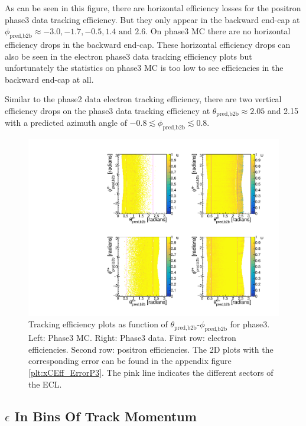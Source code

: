 \documentclass[a4paper,11pt,twosided,final,german,openbib,pdftex,listof=totoc,bibliography=totoc]{scrbook}
\begin{document}
As can be seen in this figure, there are horizontal efficiency losses for the positron phase3 data tracking efficiency. But they only appear in the backward end-cap at $\phi_{\textrm{pred,b2b}} \approx -3.0, -1.7, -0.5, 1.4 \textrm{ and } 2.6$. On phase3 MC there are no horizontal efficiency drops in the backward end-cap. These horizontal efficiency drops can also be seen in the electron phase3 data tracking efficiency plots but unfortunately the statistics on phase3 MC is too low to see efficiencies in the backward end-cap at all.

Similar to the phase2 data electron tracking efficiency, there are two vertical efficiency drops on the phase3 data tracking efficiency at $\theta_{\textrm{pred,b2b}} \approx 2.05$ and 2.15 with a predicted azimuth angle of $-0.8 \lesssim \phi_{\textrm{pred,b2b}} \lesssim 0.8$.


\begin{figure}[!htbp]
	\centering
	\includegraphics[width=\textwidth]{Plots/master3/xCEffTP_MCDataP3.pdf}
	\caption[$\theta_{\textrm{pred,b2b}}$-$\phi_{\textrm{pred,b2b}}$ Efficiency Plots Phase3]{Tracking efficiency plots as function of $\theta_{\textrm{pred,b2b}}$-$\phi_{\textrm{pred,b2b}}$ for phase3. Left: Phase3 MC. Right: Phase3 data. First row: electron efficiencies. Second row: positron efficiencies. The 2D plots with the corresponding error can be found in the appendix figure \ref{plt:xCEff_ErrorP3}. The pink line indicates the different sectors of the ECL.}
	\label{plt:xCEff3}
\end{figure}

\clearpage


\subsection{$\epsilon$ In Bins Of Track Momentum}
\end{document}
